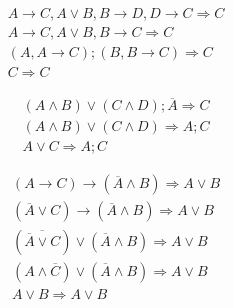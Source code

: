 \begin{task}
    \begin{gather*}
        A \to C, A \lor B, B \to D, D \to C \Rightarrow C \\
        A \to C, A \lor B, B \to C \Rightarrow C \\
        (A, A \to C); (B, B \to C) \Rightarrow C \\
        C \Rightarrow C
    \end{gather*}
\end{task}

\begin{task}
    \begin{gather*}
        (A \land B) \lor (C \land D); \overline A \Rightarrow C \\
        (A \land B) \lor (C \land D) \Rightarrow A; C \\
        A \lor C \Rightarrow A; C
    \end{gather*}
\end{task}

\begin{task}
    \begin{gather*}
        (A \to C) \to (\overline A \land B) \Rightarrow A \lor B \\
        (\overline A \lor C) \to (\overline A \land B) \Rightarrow A \lor B \\
        (\overline {\overline A \lor C}) \lor (\overline A \land B) \Rightarrow A \lor B \\
        (A \land \overline C) \lor (\overline A \land B) \Rightarrow A \lor B \\
        A \lor B \Rightarrow A \lor B
    \end{gather*}
\end{task}




